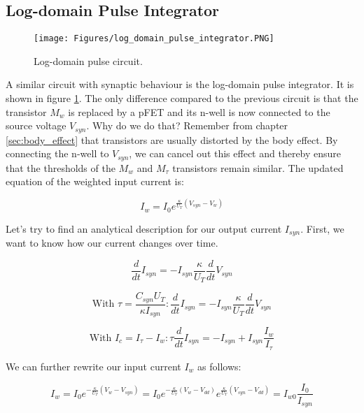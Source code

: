 \subsection{Log-domain Pulse Integrator}\label{sec:log_domain_pulse_integrator}

\begin{figure}
    \centering
    \texttt{[image: Figures/log\_domain\_pulse\_integrator.PNG]}
    \caption{Log-domain pulse circuit.}
    \label{fig:log_domain_pulse_integrator}
\end{figure}

A similar circuit with synaptic behaviour is the log-domain pulse integrator. It is shown in figure \ref{fig:log_domain_pulse_integrator}. The only difference compared to the previous circuit is that the transistor $M_w$ is replaced by a pFET and its n-well is now connected to the source voltage $V_{syn}$. Why do we do that? Remember from chapter \ref{sec:body_effect} that transistors are usually distorted by the body effect. By connecting the n-well to $V_{syn}$, we can cancel out this effect and thereby ensure that the thresholds of the $M_w$ and $M_{\tau}$ transistors remain similar. The updated equation of the weighted input current is:

\begin{equation}
    I_w = I_0 e^{\frac{\kappa}{U_T}(V_{syn}-V_w)}
\end{equation}

Let's try to find an analytical description for our output current $I_{syn}$. First, we want to know how our current changes over time.

\begin{equation}
    \frac{d}{dt} I_{syn} = -I_{syn} \frac{\kappa}{U_T} \frac{d}{dt} V_{syn}
\end{equation}

\begin{equation}
    \text{With } \tau = \frac{C_{syn}U_T}{\kappa I_{syn}}: \frac{d}{dt}I_{syn} = -I_{syn} \frac{\kappa}{U_T} \frac{d}{dt} V_{syn}
\end{equation}

\begin{equation}
    \text{With } I_c = I_{\tau} - I_w: \tau \frac{d}{dt} I_{syn} = - I_{syn} + I_{syn} \frac{I_w}{I_{\tau}}
\end{equation}

We can further rewrite our input current $I_w$ as follows:

\begin{equation}
    I_w = I_0 e^{-\frac{\kappa}{U_T}(V_w - V_{syn})} = I_0 e^{-\frac{\kappa}{U_T}(V_w - V_{dd})} e^{\frac{\kappa}{U_T}(V_{syn} - V_{dd})} = I_{w0} \frac{I_0}{I_{syn}}
\end{equation}

